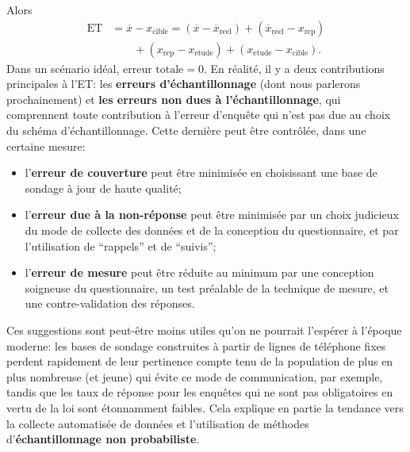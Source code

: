 Alors 
\begin{align*}\text{ET}  &= \overline{x} - x_{\mathrm{cible}}  =  (\overline{x} - \overline{x}_{\mathrm{reel}}) + (\overline{x}_{\mathrm{reel}}-x_{\mathrm{rep}}) \\ &\qquad + (x_{\mathrm{rep}}-x_{\mathrm{etude}}) + (x_{\mathrm{etude}}-x_{\mathrm{cible}}).\end{align*} 
Dans un scénario idéal, $\text{erreur totale}=0$. En réalité, il y a deux contributions principales à l'ET: les \textbf{erreurs d'échan\-til\-lon\-nage} (dont nous parlerons prochainement) et \textbf{les erreurs non dues à l'échantillonnage}, qui comprennent toute contribution à l'erreur d'enquête qui n'est pas due au choix du schéma d'échantillonnage. Cette dernière peut être contrôlée, dans une certaine mesure: 
\begin{itemize}[noitemsep]
\item l'\textbf{erreur de couverture} peut être minimisée en choisissant une base de sondage à jour de haute qualité;
\item l'\textbf{erreur due à la non-réponse} peut être minimisée par un choix judicieux du mode de collecte des données et de la conception du questionnaire, et par l'utilisation de ``rappels'' et de ``suivis'';
\item l'\textbf{erreur de mesure} peut être réduite au minimum par une conception soigneuse du questionnaire, un test préalable de la technique de mesure, et une contre-validation des réponses.  
\end{itemize}
Ces suggestions sont peut-être moins utiles qu'on ne pourrait l'espérer à l'époque moderne: les bases de sondage construites à partir de lignes de téléphone fixes perdent rapidement de leur pertinence compte tenu de la population de plus en plus nombreuse (et jeune) qui évite ce mode de communication, par exemple, tandis que les taux de réponse pour les enquêtes qui ne sont pas obligatoires en vertu de la loi sont étonnamment faibles. Cela explique en partie la tendance vers la collecte automatisée de données et l'utilisation de méthodes d'\textbf{échantillonnage non probabiliste}.     
